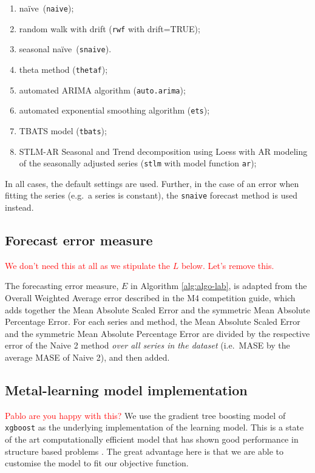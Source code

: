 \documentclass[11pt,a4paper,]{article}
\providecommand{\tightlist}{%
  \setlength{\itemsep}{0pt}\setlength{\parskip}{0pt}}
\def\naive{na\"{i}ve}
\theoremstyle{definition}
\theoremstyle{definition}
\theoremstyle{definition}
\theoremstyle{remark}
\begin{document}
\begin{enumerate}
\def\labelenumi{\roman{enumi}.}
\tightlist
\item
  \naive~(\texttt{naive});
\item
  random walk with drift (\texttt{rwf} with drift=TRUE);
\item
  seasonal \naive~(\texttt{snaive}).
\item
  theta method (\texttt{thetaf});
\item
  automated ARIMA algorithm (\texttt{auto.arima});
\item
  automated exponential smoothing algorithm (\texttt{ets});
\item
  TBATS model (\texttt{tbats});
\item
  STLM-AR Seasonal and Trend decomposition using Loess with AR modeling
  of the seasonally adjusted series (\texttt{stlm} with model function
  \texttt{ar});
\end{enumerate}

In all cases, the default settings are used. Further, in the case of an
error when fitting the series (e.g.~a series is constant), the
\texttt{snaive} forecast method is used instead.

\subsection{Forecast error measure}\label{forecast-error-measure}

\textcolor{red}{We don't need this at all as we stipulate the $L$  below. Let's remove this.}

The forecasting error measure, \(E\) in Algorithm \ref{alg:algo-lab}, is
adapted from the Overall Weighted Average error described in the M4
competition guide, which adds together the Mean Absolute Scaled Error
and the symmetric Mean Absolute Percentage Error. For each series and
method, the Mean Absolute Scaled Error and the symmetric Mean Absolute
Percentage Error are divided by the respective error of the Naive 2
method \emph{over all series in the dataset} (i.e.~MASE by the average
MASE of Naive 2), and then added.

\subsection{Metal-learning model
implementation}\label{metal-learning-model-implementation}


\textcolor{red}{Pablo are you happy with this?} We use the gradient tree
boosting model of \texttt{xgboost} as the underlying implementation of
the learning model. This is a state of the art computationally efficient
model that has shown good performance in structure based problems
\autocite{chen2016xgboost}. The great advantage here is that we are able
to customise the model to fit our objective function.
\end{document}
